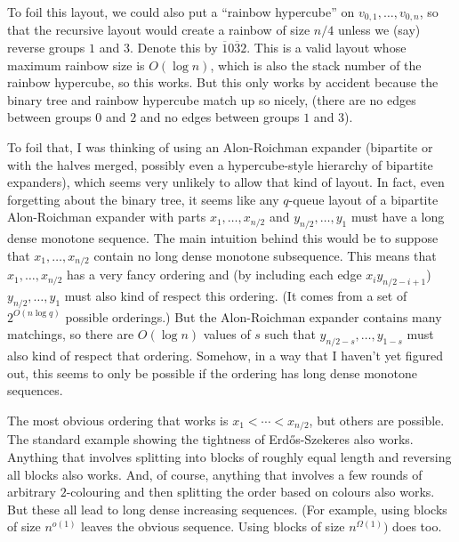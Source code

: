 \documentclass{patmorin}
\begin{document}
To foil this layout, we could also put a ``rainbow hypercube'' on $v_{0,1},\ldots,v_{0,n}$, so that the recursive layout would create a rainbow of size $n/4$ unless we (say) reverse groups $1$ and $3$.  Denote this by $\overline{1}0\overline{3}2$.  This is a valid layout whose maximum rainbow size is $O(\log n)$, which is also the stack number of the rainbow hypercube, so this works.  But this only works by accident because the binary tree and rainbow hypercube match up so nicely, (there are no edges between groups $0$ and $2$ and no edges between groups $1$ and $3$).

To foil that, I was thinking of using an Alon-Roichman expander (bipartite or with the halves merged, possibly even a hypercube-style hierarchy of bipartite expanders), which seems very unlikely to allow that kind of layout.  In fact, even forgetting about the binary tree, it seems like any $q$-queue layout of a bipartite Alon-Roichman expander with parts $x_1,\ldots,x_{n/2}$ and $y_{n/2},\ldots,y_{1}$ must have a long dense monotone sequence.   The main intuition behind this would be to suppose that $x_1,\ldots,x_{n/2}$ contain no long dense monotone subsequence.  This means that $x_1,\ldots,x_{n/2}$ has a very fancy ordering and (by including each edge $x_iy_{n/2-i+1}$) $y_{n/2},\ldots,y_{1}$ must also kind of respect this ordering.  (It comes from a set of $2^{O(n\log q)}$ possible orderings.)  But the Alon-Roichman expander contains many matchings, so there are $O(\log n)$ values of $s$ such that $y_{n/2-s},\ldots,y_{1-s}$ must also kind of respect that ordering.   Somehow, in a way that I haven't yet figured out, this seems to only be possible if the ordering has long dense monotone sequences.

The most obvious ordering that works is $x_1<\cdots<x_{n/2}$, but others are possible. The standard example showing the tightness of Erd\H{o}s-Szekeres also works.  Anything that involves splitting into blocks of roughly equal length and reversing all blocks also works.  And, of course, anything that involves a few rounds of arbitrary $2$-colouring and then splitting the order based on colours also works.  But these all lead to long dense increasing sequences.  (For example, using blocks of size $n^{o(1)}$ leaves the obvious sequence.  Using blocks of size $n^{\Omega(1)})$ does too.



%
%
\end{document}

